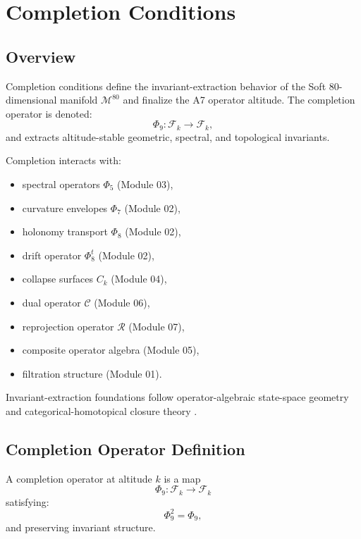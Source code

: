 
\section{Completion Conditions}
\label{sec:CompletionConditions}

\subsection{Overview}
Completion conditions define the invariant-extraction behavior of the Soft
80-dimensional manifold $\mathcal{M}^{80}$ and finalize the A7 operator
altitude. The completion operator is denoted:
\[
\Phi_9 : \mathcal{F}_k \to \mathcal{F}_k,
\]
and extracts altitude-stable geometric, spectral, and topological invariants.

Completion interacts with:
\begin{itemize}
    \item spectral operators $\Phi_5$ (Module 03),
    \item curvature envelopes $\Phi_7$ (Module 02),
    \item holonomy transport $\Phi_8$ (Module 02),
    \item drift operator $\Phi_8^t$ (Module 02),
    \item collapse surfaces $C_k$ (Module 04),
    \item dual operator $\mathcal{C}$ (Module 06),
    \item reprojection operator $\mathcal{R}$ (Module 07),
    \item composite operator algebra (Module 05),
    \item filtration structure (Module 01).
\end{itemize}

Invariant-extraction foundations follow operator-algebraic state-space geometry
 and categorical-homotopical closure theory
.

\subsection{Completion Operator Definition}
\begin{definition}
A completion operator at altitude $k$ is a map
\[
\Phi_9 : \mathcal{F}_k \to \mathcal{F}_k
\]
satisfying:
\[
\Phi_9^2 = \Phi_9,
\]
and preserving invariant structure.
\end{definition}

